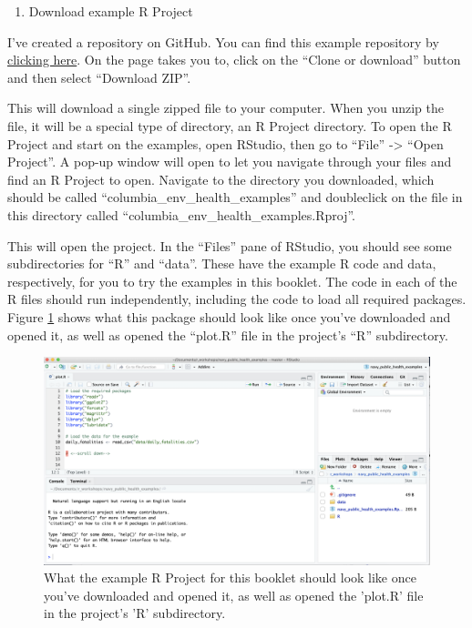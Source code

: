 \documentclass[]{tufte-book}
\providecommand{\tightlist}{%
  \setlength{\itemsep}{0pt}\setlength{\parskip}{0pt}}
\begin{document}
\begin{enumerate}
\def\labelenumi{\arabic{enumi}.}
\setcounter{enumi}{3}
\tightlist
\item
  Download example R Project
\end{enumerate}

I've created a repository on GitHub. You can find this example
repository by \href{https://github.com/geanders/columbia_env_health_examples}{clicking here}. On the
page takes you to, click on the ``Clone or download'' button and then select ``Download ZIP''.

This will download a single zipped file to your computer. When you unzip the file, it will be a
special type of directory, an R Project directory. To open the R Project and start on the
examples, open RStudio, then go to ``File'' -\textgreater{} ``Open Project''. A pop-up window will open to let you
navigate through your files and find an R Project to open. Navigate to the directory you
downloaded, which should be called ``columbia\_env\_health\_examples'' and doubleclick on the file
in this directory called ``columbia\_env\_health\_examples.Rproj''.

This will open the project. In the ``Files'' pane of RStudio, you should see some subdirectories for
``R'' and ``data''. These have the example R code and data, respectively, for you to try the examples
in this booklet. The code in each of the R files should run independently, including the code to
load all required packages. Figure \ref{fig:examplerepo} shows what this package should
look like once you've downloaded and opened it, as well as opened the ``plot.R'' file in the
project's ``R'' subdirectory.

\begin{figure}
\includegraphics[width=38.64in]{images/example_repo} \caption[What the example R Project for this booklet should look like once you've downloaded and opened it, as well as opened the 'plot.R' file in the project's 'R' subdirectory]{What the example R Project for this booklet should look like once you've downloaded and opened it, as well as opened the 'plot.R' file in the project's 'R' subdirectory.}\label{fig:examplerepo}
\end{figure}
\end{document}
